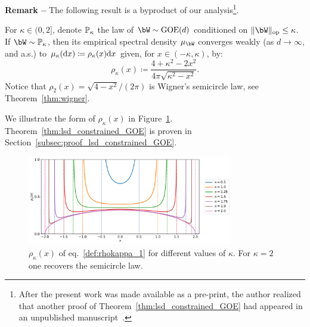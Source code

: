 \myskip
\textbf{Remark --}
The following result is a byproduct of our analysis\footnote{
After the present work was made available as a pre-print, the author realized that another proof of Theorem~\ref{thm:lsd_constrained_GOE} had appeared in an unpublished manuscript~\citep{bouali2015constrained}.
}.
\begin{theorem}\label{thm:lsd_constrained_GOE}
   For $\kappa \in (0,2]$, denote $\mathbb{P}_\kappa$ the law of $\bW \sim \GOE(d)$ conditioned on $\|\bW\|_\op \leq \kappa$. 
    If $\bW \sim \bbP_\kappa$, then its empirical spectral density $\mu_\bW$ converges weakly (as $d \to \infty$, and a.s.) to $\mu_\kappa(\mathrm{d} x) \coloneqq \rho_\kappa(x) \mathrm{d} x$ given, for $x \in (-\kappa, \kappa)$, by:
    \begin{equation}
        \label{def:rhokappa_1}
        \rho_\kappa(x) \coloneqq \frac{4+\kappa^2-2x^2}{4 \pi \sqrt{\kappa^2 - x^2}}. 
    \end{equation}
    Notice that $\rho_{2}(x) = \sqrt{4 - x^2}/(2\pi)$ is Wigner's semicircle law, see Theorem~\ref{thm:wigner}.
\end{theorem}
\noindent
We illustrate the form of $\rho_\kappa(x)$ in Figure~\ref{fig:rho_kappa}.
Theorem~\ref{thm:lsd_constrained_GOE} is proven in Section~\ref{subsec:proof_lsd_constrained_GOE}.
\begin{figure}[!t]
   \centering
\includegraphics[width=0.8\textwidth]{figures/rho_kappa.pdf}
\caption{$\rho_\kappa(x)$ of eq.~\eqref{def:rhokappa_1} for different values of $\kappa$. For $\kappa = 2$ one recovers the semicircle law.\label{fig:rho_kappa}}
\end{figure}

